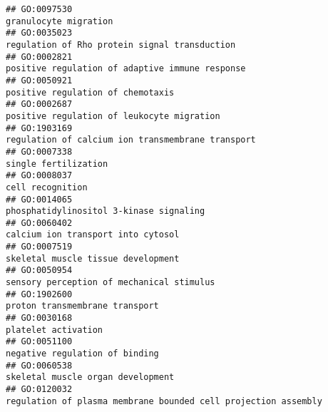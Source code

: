 \documentclass[
]{article}
\begin{document}
\begin{verbatim}
## GO:0097530                                                                                                                            granulocyte migration
## GO:0035023                                                                                                    regulation of Rho protein signal transduction
## GO:0002821                                                                                                  positive regulation of adaptive immune response
## GO:0050921                                                                                                                positive regulation of chemotaxis
## GO:0002687                                                                                                       positive regulation of leukocyte migration
## GO:1903169                                                                                                regulation of calcium ion transmembrane transport
## GO:0007338                                                                                                                             single fertilization
## GO:0008037                                                                                                                                 cell recognition
## GO:0014065                                                                                                          phosphatidylinositol 3-kinase signaling
## GO:0060402                                                                                                               calcium ion transport into cytosol
## GO:0007519                                                                                                               skeletal muscle tissue development
## GO:0050954                                                                                                        sensory perception of mechanical stimulus
## GO:1902600                                                                                                                   proton transmembrane transport
## GO:0030168                                                                                                                              platelet activation
## GO:0051100                                                                                                                   negative regulation of binding
## GO:0060538                                                                                                                skeletal muscle organ development
## GO:0120032                                                                                   regulation of plasma membrane bounded cell projection assembly

\end{verbatim}
\end{document}
